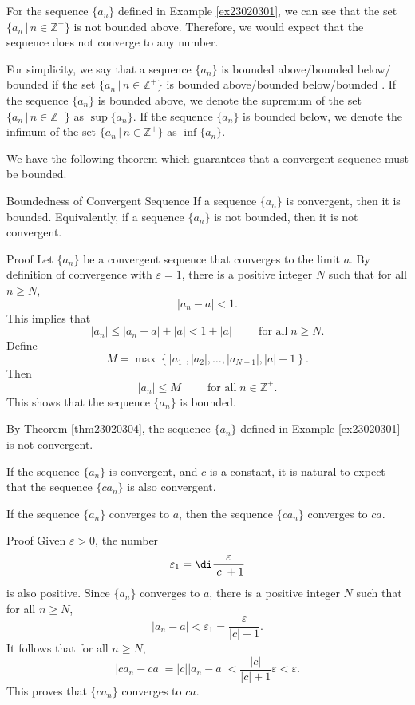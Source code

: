 For the sequence $\{a_n\}$ defined in Example \ref{ex23020301}, we can see that the set $\{a_n\,|\, n\in \mathbb{Z}^+\}$ is not bounded above. Therefore, we would expect that the sequence does not converge to any number.

For simplicity, we say that a sequence $\{a_n\}$ is bounded above/bounded below/ bounded if the set $\{a_n\,|\, n\in \mathbb{Z}^+\}$  is bounded above/bounded below/bounded . If  the sequence $\{a_n\}$ is bounded above, we denote the supremum of the set $\{a_n\,|\, n\in \mathbb{Z}^+\}$  as $\sup\{a_n\}$. If  the sequence $\{a_n\}$ is bounded below, we denote the infimum of the set $\{a_n\,|\, n\in \mathbb{Z}^+\}$  as $\inf\{a_n\}$. 

We have the following theorem which guarantees that a convergent sequence must be bounded.

\begin{theorem}[label=thm23020304]{Boundedness of Convergent Sequence}
If a sequence $\{a_n\}$ is convergent, then it is bounded. Equivalently, if a sequence $\{a_n\}$ is not bounded, then it is not convergent.
\end{theorem}
\begin{myproof}{Proof}
Let $\{a_n\}$ be a convergent sequence that converges to the limit $a$. By definition of convergence with $\varepsilon=1$, there is a positive integer $N$ such that for all $n\geq N$,
\[|a_n-a|<1.\]
This implies that
\[|a_n|\leq |a_n-a|+|a|<1+|a|\hspace{1cm}\text{for all}\;n\geq N.\]
Define
\[M=\max\left\{|a_1|, |a_2|, \ldots, |a_{N-1}|, |a|+1\right\}.\]Then 
\[|a_n|\leq M\hspace{1cm}\text{for all}\;n\in \mathbb{Z}^+.\]This shows that the sequence $\{a_n\}$ is bounded.
\end{myproof}

\begin{example}{}
By Theorem  \ref{thm23020304},  the sequence $\{a_n\}$ defined in Example \ref{ex23020301} is not convergent.\end{example}

If the sequence $\{a_n\}$ is convergent, and $c$ is a constant, it is natural to expect that the sequence $\{ca_n\}$ is also convergent.  

\begin{proposition}[label=p23020401]{}
If the sequence $\{a_n\}$ converges to $a$, then the sequence $\{ca_n\}$ converges to $ca$.
\end{proposition}
\begin{myproof}{Proof}
  Given $\varepsilon>0$, the number\[\varepsilon_1=\di\frac{\varepsilon}{|c|+1}\] is also positive. Since $\{a_n\}$ converges to $a$, there is a positive integer $N$ such that for all $n\geq N$,
\[|a_n-a|<\varepsilon_1=\frac{\varepsilon}{|c|+1}.\]
It follows that for all $n\geq N$,
\[|ca_n-ca|=|c||a_n-a|<\frac{|c|}{|c|+1}\varepsilon<\varepsilon.\]
This proves that $\{ca_n\}$ converges to $ca$.
\end{myproof}

